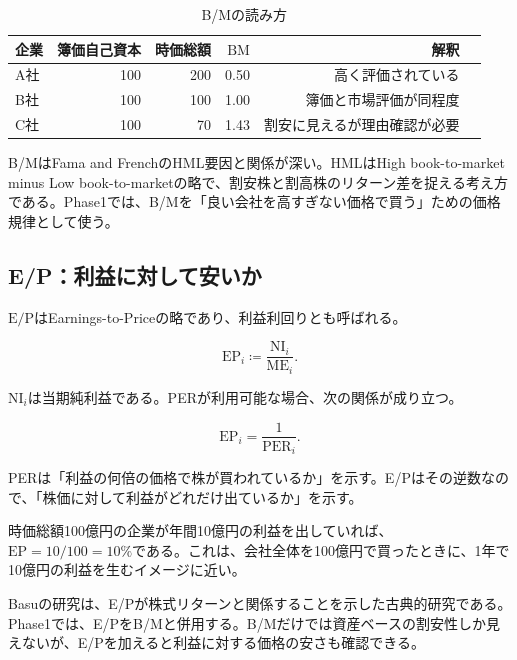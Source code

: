 \documentclass[11pt,a4paper]{article}
\newcommand{\ME}{\mathrm{ME}}
\newcommand{\NI}{\mathrm{NI}}
\newcommand{\EPratio}{\mathrm{E/P}}
\begin{document}
\begin{table}[tbp]
\caption{B/Mの読み方}
\label{tab:bm-example}
\centering
\small
\begin{tabular}{lrrrrl}
\toprule
企業 & 簿価自己資本 & 時価総額 & $\mathrm{BM}$ & 解釈 \\
\midrule
A社 & 100 & 200 & 0.50 & 高く評価されている \\
B社 & 100 & 100 & 1.00 & 簿価と市場評価が同程度 \\
C社 & 100 & 70 & 1.43 & 割安に見えるが理由確認が必要 \\
\bottomrule
\end{tabular}
\end{table}

B/MはFama and FrenchのHML要因と関係が深い。HMLはHigh book-to-market minus Low book-to-marketの略で、割安株と割高株のリターン差を捉える考え方である。Phase1では、B/Mを「良い会社を高すぎない価格で買う」ための価格規律として使う。

\subsection{E/P：利益に対して安いか}

$\EPratio$はEarnings-to-Priceの略であり、利益利回りとも呼ばれる。

\begin{equation}
\mathrm{EP}_i \coloneqq \frac{\NI_i}{\ME_i}.
\label{eq:ep}
\end{equation}

$\NI_i$は当期純利益である。PERが利用可能な場合、次の関係が成り立つ。

\begin{equation}
\mathrm{EP}_i = \frac{1}{\mathrm{PER}_i}.
\label{eq:ep-per}
\end{equation}

PERは「利益の何倍の価格で株が買われているか」を示す。E/Pはその逆数なので、「株価に対して利益がどれだけ出ているか」を示す。

\begin{defbox}[直感]
時価総額100億円の企業が年間10億円の利益を出していれば、$\mathrm{EP}=10/100=10\%$である。これは、会社全体を100億円で買ったときに、1年で10億円の利益を生むイメージに近い。
\end{defbox}

Basuの研究は、E/Pが株式リターンと関係することを示した古典的研究である。Phase1では、E/PをB/Mと併用する。B/Mだけでは資産ベースの割安性しか見えないが、E/Pを加えると利益に対する価格の安さも確認できる。
\end{document}
